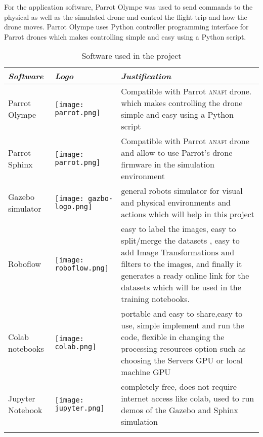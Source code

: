 \documentclass[../main.tex]{subfiles}
\begin{document}
For the application software, Parrot Olympe 
was used to send commands to the physical as well as 
the simulated drone and control the flight trip and 
how the drone moves. Parrot Olympe uses Python 
controller programming interface for Parrot drones 
which makes controlling simple and easy using a 
Python script.

\begin{table}[H]
	\centering
	\caption{Software used in the project}
    \label{tab:software-used}  
	\begin{tabular}{ p{3cm} p{3cm} p{6cm} }
		\toprule
		\textit{Software} & \textit{Logo} & \textit{Justification} \\ \midrule
		Parrot Olympe  & \begin{minipage}{.1\textwidth}
			\texttt{[image: parrot.png]}
		\end{minipage} & Compatible with Parrot \textsc{anafi} drone.
	which makes controlling the drone simple and easy using a 
Python script \\ \addlinespace
		Parrot Sphinx  & \begin{minipage}{.0\textwidth}
			\texttt{[image: parrot.png]}
		\end{minipage} & Compatible with Parrot \textsc{anafi} drone and allow to use Parrot's drone firmware in the simulation environment\\ \addlinespace
		Gazebo simulator  & \begin{minipage}{.1\textwidth}
			\texttt{[image: gazbo-logo.png]}
		\end{minipage}  & general robots simulator for visual and physical environments and actions which will help in this project \\ \addlinespace
		Roboflow  & \begin{minipage}{.1\textwidth}
			\texttt{[image: roboflow.png]}
		\end{minipage} & easy to label the images, easy to split/merge the datasets , easy to add Image Transformations and filters to the images, and finally it generates a ready online link for the datasets which will be used in the training notebooks.  \\ \addlinespace
		Colab notebooks  & \begin{minipage}{.1\textwidth}
			\texttt{[image: colab.png]}
		\end{minipage} & portable and easy to share,easy to use, simple implement and run the code, flexible in changing the processing resources option such as choosing the Servers GPU  or local machine GPU \\ \addlinespace
		Jupyter Notebook  & \begin{minipage}{.1\textwidth}
			\texttt{[image: jupyter.png]}
		\end{minipage} & completely free, does not require internet access like colab, used to run demos of the Gazebo and Sphinx simulation\\ \addlinespace
		\bottomrule
	\end{tabular}
\end{table}
\end{document}
